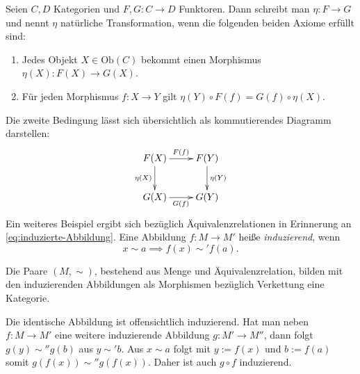 \begin{Definition}
Seien $C,D$ Kategorien und $F,G\colon C\to D$ Funktoren.
Dann schreibt man $\eta\colon F\to G$ und nennt $\eta$ natürliche
Transformation, wenn die folgenden beiden Axiome erfüllt sind:
\begin{enumerate}
\item Jedes Objekt $X\in\mathrm{Ob}(C)$ bekommt einen Morphismus
$\eta(X)\colon F(X)\to G(X)$.
\item Für jeden Morphismus $f\colon X\to Y$ gilt
$\eta(Y)\circ F(f)=G(f)\circ\eta(X)$.
\end{enumerate}
\end{Definition}
Die zweite Bedingung lässt sich übersichtlich als kommutierendes Diagramm
darstellen:
\[\xymatrix{
F(X) \ar[r]^{F(f)} \ar[d]_{\eta(X)} & F(Y) \ar[d]^{\eta(Y)} \\
G(X) \ar[r]_{G(f)} & G(Y)}\]
Ein weiteres Beispiel ergibt sich bezüglich Äquivalenzrelationen
in Erinnerung an \eqref{eq:induzierte-Abbildung}.
Eine Abbildung $f\colon M\to M'$ heiße \emph{induzierend}, wenn%
\begin{equation}
x\sim a \implies f(x)\sim' f(a).
\end{equation}
\begin{Satz}
Die Paare $(M,\sim)$, bestehend aus Menge und Äquivalenzrelation,
bilden mit den induzierenden Abbildungen
als Morphismen bezüglich Verkettung eine Kategorie.
\end{Satz}
Die identische Abbildung ist offensichtlich induzierend. Hat man
neben $f\colon M\to M'$ eine weitere induzierende Abbildung $g\colon M'\to M''$, dann
folgt $g(y)\sim'' g(b)$ aus $y\sim' b$. Aus $x\sim a$ folgt
mit $y:=f(x)$ und $b:=f(a)$ somit $g(f(x))\sim'' g(f(x))$.
Daher ist auch $g\circ f$ induzierend.\;\qedsymbol


